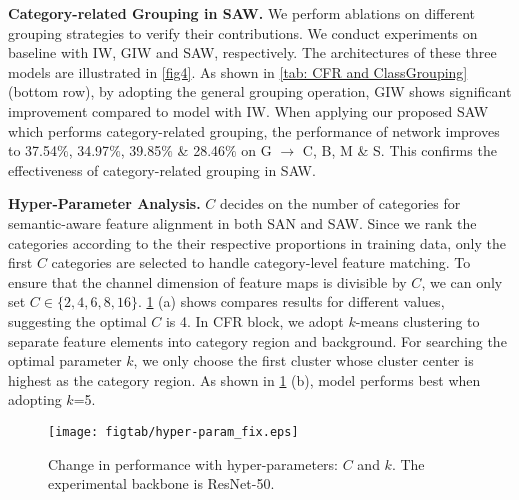 \documentclass[10pt,twocolumn,letterpaper]{article}
\begin{document}
\textbf{Category-related Grouping in SAW.} We perform ablations on different grouping strategies to verify their contributions. We conduct experiments on baseline with IW, GIW and SAW, respectively. The architectures of these three models are illustrated in \cref{fig4}. As shown in \cref{tab: CFR and ClassGrouping} (bottom row), by adopting the general grouping operation, GIW shows significant improvement compared to model with IW. When applying our proposed SAW which performs category-related grouping, the performance of network improves to 37.54$\%$, 34.97$\%$, 39.85$\%$ \& 28.46$\%$ on G $\rightarrow$ C, B, M \& S. This confirms the effectiveness of category-related grouping in SAW. 

\textbf{Hyper-Parameter Analysis.\label{sec: hyper-param}} $C$ decides on the number of categories for semantic-aware feature alignment in both SAN and SAW. Since we rank the categories according to the their respective proportions in training data, only the first $C$ categories are selected to handle category-level feature matching. To ensure that the channel dimension of feature maps is divisible by $C$, we can only set $C\in\{2,4,6,8,16\}$. \cref{fig6} (a) shows compares results for different values, suggesting the optimal $C$ is 4. In CFR block, we adopt $k$-means clustering to separate feature elements into category region and background. For searching the optimal parameter $k$, we only choose the first cluster whose cluster center is highest as the category region. As shown in \cref{fig6} (b), model performs best when adopting $k$=5.
\vspace{-2.75mm}


\begin{figure}[t]
    \centering{}\vspace{0mm}
     \texttt{[image: figtab/hyper-param\_fix.eps]} 
     \vspace{-6mm}
     \caption{Change in performance with hyper-parameters: $C$ and $k$. The experimental backbone is ResNet-50.
     }
    \label{fig6}\vspace{-5mm}
    
    \end{figure}
\end{document}

